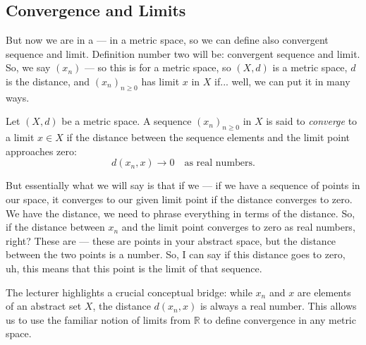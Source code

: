 \subsection{Convergence and Limits}

\begin{spoken-clean}[00:03:00 - 00:04:11]
But now we are in a — in a metric space, so we can define also convergent sequence and limit. Definition number two will be: convergent sequence and limit.  So, we say $(x_n)$ — so this is for a metric space, so $(X, d)$ is a metric space, $d$ is the distance, and $(x_n)_{n \ge 0}$ has limit $x$ in $X$ if... well, we can put it in many ways.
\end{spoken-clean}

\begin{math-stroke}
\begin{definition}\label{def:convergence-limit}
Let $(X, d)$ be a metric space. A sequence $(x_n)_{n \ge 0}$ in $X$ is said to \emph{converge} to a limit $x \in X$ if the distance between the sequence elements and the limit point approaches zero:
\[ d(x_n, x) \to 0 \quad \text{as real numbers}. \]
\end{definition}
\end{math-stroke}

\begin{spoken-clean}[00:04:11 - 00:05:15]
But essentially what we will say is that if we — if we have a sequence of points in our space, it converges to our given limit point if the distance converges to zero. We have the distance, we need to phrase everything in terms of the distance. So, if the distance between $x_n$ and the limit point converges to zero as real numbers, right? These are — these are points in your abstract space, but the distance between the two points is a number. So, I can say if this distance goes to zero, uh, this means that this point is the limit of that sequence.
\end{spoken-clean}

\begin{didactic-insight}
The lecturer highlights a crucial conceptual bridge: while $x_n$ and $x$ are elements of an abstract set $X$, the distance $d(x_n, x)$ is always a real number. This allows us to use the familiar notion of limits from $\mathbb{R}$ to define convergence in any metric space.
\end{didactic-insight}

